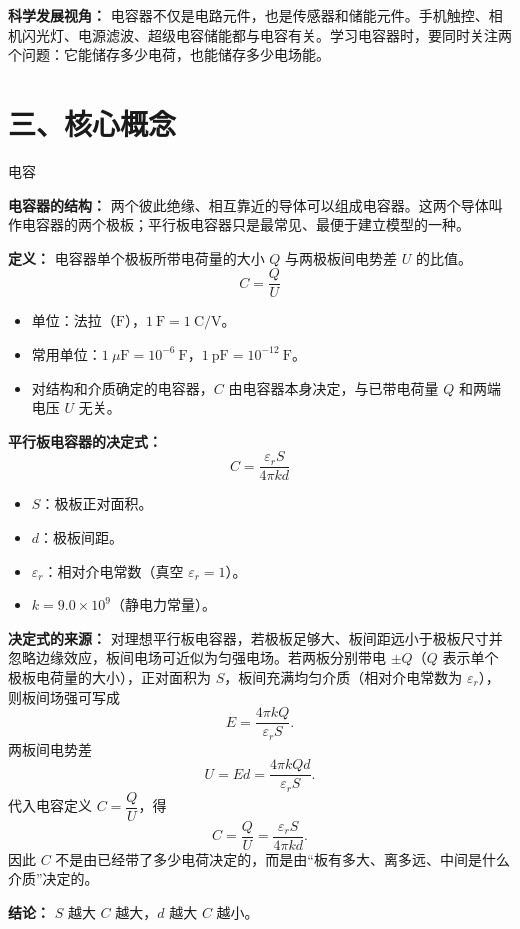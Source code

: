 \textbf{科学发展视角：} 电容器不仅是电路元件，也是传感器和储能元件。手机触控、相机闪光灯、电源滤波、超级电容储能都与电容有关。学习电容器时，要同时关注两个问题：它能储存多少电荷，也能储存多少电场能。

\section*{三、核心概念}

\begin{conceptbox}{电容}

\textbf{电容器的结构：} 两个彼此绝缘、相互靠近的导体可以组成电容器。这两个导体叫作电容器的两个极板；平行板电容器只是最常见、最便于建立模型的一种。

\textbf{定义：} 电容器单个极板所带电荷量的大小 $Q$ 与两极板间电势差 $U$ 的比值。
\[
\boxed{C = \frac{Q}{U}}
\]

\begin{itemize}
  \item 单位：法拉（$\mathrm{F}$），$1\ \mathrm{F} = 1\ \mathrm{C/V}$。
  \item 常用单位：$1\ \mu\mathrm{F} = 10^{-6}\ \mathrm{F}$，$1\ \mathrm{pF} = 10^{-12}\ \mathrm{F}$。
  \item 对结构和介质确定的电容器，$C$ 由电容器本身决定，与已带电荷量 $Q$ 和两端电压 $U$ 无关。
\end{itemize}

\textbf{平行板电容器的决定式：}
\[
\boxed{C = \frac{\varepsilon_r S}{4\pi k d}}
\]

\begin{itemize}
  \item $S$：极板正对面积。
  \item $d$：极板间距。
  \item $\varepsilon_r$：相对介电常数（真空 $\varepsilon_r = 1$）。
  \item $k = 9.0 \times 10^9$（静电力常量）。
\end{itemize}

\textbf{决定式的来源：} 对理想平行板电容器，若极板足够大、板间距远小于极板尺寸并忽略边缘效应，板间电场可近似为匀强电场。若两板分别带电 $\pm Q$（$Q$ 表示单个极板电荷量的大小），正对面积为 $S$，板间充满均匀介质（相对介电常数为 $\varepsilon_r$），则板间场强可写成
\[
E=\frac{4\pi kQ}{\varepsilon_r S}.
\]
两板间电势差
\[
U=Ed=\frac{4\pi kQd}{\varepsilon_r S}.
\]
代入电容定义 $C=\dfrac{Q}{U}$，得
\[
C=\frac{Q}{U}=\frac{\varepsilon_r S}{4\pi k d}.
\]
因此 $C$ 不是由已经带了多少电荷决定的，而是由“板有多大、离多远、中间是什么介质”决定的。

\textbf{结论：} $S$ 越大 $C$ 越大，$d$ 越大 $C$ 越小。

\begin{center}


\label{fig:capacitor-plate}
\end{center}

\end{conceptbox}

